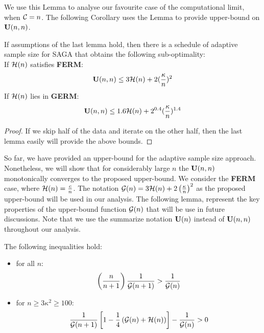 \documentclass{article}
\begin{document}
We use this Lemma to analyse our favourite case of the computational limit, when
${\cal C} = n$. The following Corollary uses the Lemma to provide upper-bound on
$\mathbf U(n,n)$. 
\begin{corollary}
	If assumptions of the last lemma hold, then there is a schedule of adaptive
	sample size for SAGA that obtains the following sub-optimality: \\ 
	If ${\cal H}(n)$ satisfies \textbf{FERM}:  
	\begin{equation*}
		\mathbf U(n,n) \leq 3 {\cal H}(n) + 2 (\frac{\kappa}{ n})^2
	\end{equation*}
	If ${\cal H}(n)$ lies in \textbf{GERM}: 
	\begin{equation*}
		\mathbf U(n,n) \leq 1.6 {\cal H}(n) + 2^{0.4} (\frac{\kappa}{n})^{1.4}
	\end{equation*}
\end{corollary}	
\begin{proof}
	If we skip half of the data and iterate on the other half, then the
	last lemma easily will provide the above bounds. 
\end{proof}
So far, we have provided an upper-bound for the adaptive sample size approach.
Nonetheless, we will show that for considerably large $n$ the
$\mathbf U(n,n)$ monotonically converges to the proposed upper-bound. We consider the
\textbf{FERM} case, where ${\cal H}(n) = \frac{c}{n}$. The notation ${\cal G}(n)  =  3
{\cal H}(n) + 2 \left(\frac{\kappa}{n}\right)^2$ as the proposed upper-bound will
be used in our analysis. The following lemma, represent the key
properties of the upper-bound function ${\cal G}(n)$ that will be use in future
discussions. Note that we use the summarize notation $\mathbf U(n)$ instead of
$\mathbf U(n,n)$ throughout our analysis.
\begin{lemma} \label{lemma:gn_ineq}
	The following inequalities hold: 
	\begin{itemize}
	  \item for all $n$:
	  \begin{equation*}
		\left( \frac{n}{n+1}\right) \frac{1}{{\cal G}(n+1)}  > 
	\frac{1}{{\cal G}(n)}
	\end{equation*}
	\item for $n \geq 3 \kappa^2 \geq 100$:
	\begin{equation*}
		\frac{1}{{\cal G}(n+1)}
	\left[1 - \frac{1	}{4} \left( {\cal G}(n) + {\cal H}(n)\right)  \right] - 
	\frac{1}{{\cal G}(n)} > 0
	\end{equation*}
	\end{itemize}
\end{lemma}
\end{document}
